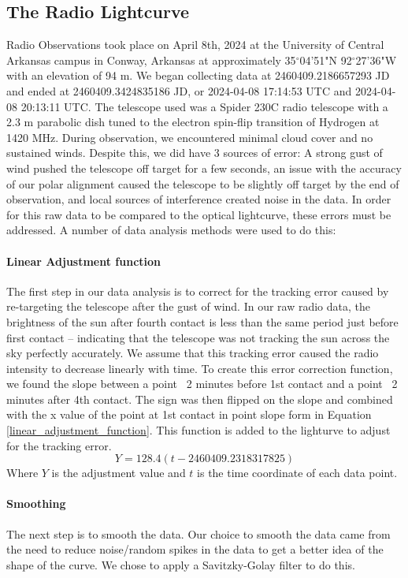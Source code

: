 \subsection{\label{sec:radio}The Radio Lightcurve}
Radio Observations took place on April 8th, 2024 at the University of Central Arkansas campus in Conway, Arkansas at approximately 35$^\circ$04'51"N 92$^\circ$27'36"W with an elevation of 94 m.
We began collecting data at 2460409.2186657293 JD and ended at 2460409.3424835186 JD, or 2024-04-08 17:14:53 UTC and 2024-04-08 20:13:11 UTC.
The telescope used was a Spider 230C radio telescope with a 2.3 m parabolic dish tuned to the electron spin-flip transition of Hydrogen at 1420 MHz.
During observation, we encountered minimal cloud cover and no sustained winds.
Despite this, we did have 3 sources of error: A strong gust of wind pushed the telescope off target for a few seconds, an issue with the accuracy of our polar alignment caused the telescope to be slightly off target by the end of observation, and local sources of interference created noise in the data.
In order for this raw data to be compared to the optical lightcurve, these errors must be addressed.
A number of data analysis methods were used to do this:
\paragraph{Linear Adjustment function}
The first step in our data analysis is to correct for the tracking error caused by re-targeting the telescope after the gust of wind.
In our raw radio data, the brightness of the sun after fourth contact is less than the same period just before first contact -- indicating that the telescope was not tracking the sun across the sky perfectly accurately.
We assume that this tracking error caused the radio intensity to decrease linearly with time.
To create this error correction function, we found the slope between a point ~2 minutes before 1st contact and a point ~2 minutes after 4th contact. 
The sign was then flipped on the slope and combined with the x value of the point at 1st contact in point slope form in Equation \ref{linear_adjustment_function}.
This function is added to the lighturve to adjust for the tracking error.
\begin{equation}\label{linear_adjustment_function}
Y = 128.4(t-2460409.2318317825)
\end{equation}
Where $Y$ is the adjustment value and $t$ is the time coordinate of each data point. 
\paragraph{Smoothing}
The next step is to smooth the data.
Our choice to smooth the data came from the need to reduce noise/random spikes in the data to get a better idea of the shape of the curve.
We chose to apply a Savitzky-Golay filter \cite{savitzky_golay_1964} to do this.
